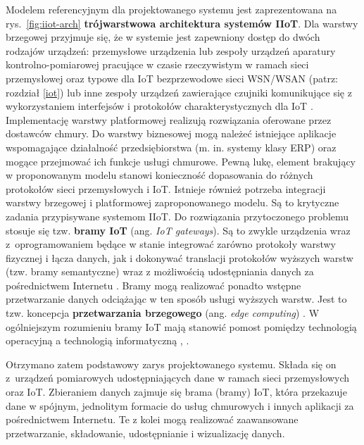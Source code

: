 \documentclass[a4paper, 12pt, twoside]{article}
\begin{document}
Modelem referencyjnym dla projektowanego systemu jest zaprezentowana na rys.~\ref{fig:iiot-arch}
\textbf{trójwarstwowa architektura systemów IIoT}. Dla warstwy brzegowej przyjmuje
się, że w systemie jest zapewniony dostęp do dwóch rodzajów urządzeń: przemysłowe urządzenia
lub zespoły urządzeń aparatury kontrolno-pomiarowej pracujące w czasie rzeczywistym
w ramach sieci przemysłowej
oraz typowe dla IoT bezprzewodowe sieci WSN/WSAN (patrz: rozdział \ref{iot})
lub inne zespoły urządzeń zawierające czujniki komunikujące się z wykorzystaniem
interfejsów i protokołów charakterystycznych dla IoT \cite{iiot-gateway-introduction}. Implementację warstwy
platformowej realizują rozwiązania oferowane przez dostawców chmury.
Do warstwy biznesowej mogą należeć istniejące aplikacje
wspomagające działalność przedsiębiorstwa
(m. in. systemy klasy ERP) oraz mogące przejmować ich funkcje usługi chmurowe.
Pewną lukę, element brakujący w proponowanym modelu stanowi konieczność dopasowania
do różnych protokołów sieci przemysłowych i IoT. Istnieje również potrzeba integracji
warstwy brzegowej i platformowej zaproponowanego modelu. Są to krytyczne zadania
przypisywane systemom IIoT. Do rozwiązania
przytoczonego problemu stosuje się tzw. \textbf{bramy IoT} (ang. \emph{IoT gateways}). Są to zwykle
urządzenia wraz z~oprogramowaniem będące w stanie integrować zarówno protokoły
warstwy fizycznej i łącza danych, jak i dokonywać translacji protokołów wyższych warstw
(tzw. bramy semantyczne) wraz z możliwością udostępniania danych za pośrednictwem
Internetu \cite{iiot-heterogenous-gateways}. Bramy mogą realizować ponadto
wstępne przetwarzanie danych odciążając w ten sposób usługi wyższych warstw.
Jest to tzw. koncepcja \textbf{przetwarzania brzegowego} (ang. \emph{edge computing}) \cite{iot-gateway-medical-and-industrial}.
W ogólniejszym rozumieniu bramy IoT mają stanowić pomost pomiędzy technologią operacyjną a
technologią informatyczną \cite{iiot-gateway-introduction}, \cite{iiot-challenges-opportunities-directions}.

Otrzymano zatem podstawowy zarys projektowanego systemu.
Składa się on z~urządzeń pomiarowych udostępniających dane w ramach sieci
przemysłowych oraz IoT. Zbieraniem danych zajmuje się brama (bramy) IoT, która
przekazuje dane w spójnym, jednolitym
formacie do usług chmurowych i innych aplikacji za pośrednictwem Internetu.
Te z kolei mogą realizować zaawansowane przetwarzanie, składowanie, udostępnianie
i wizualizację danych.
\end{document}
